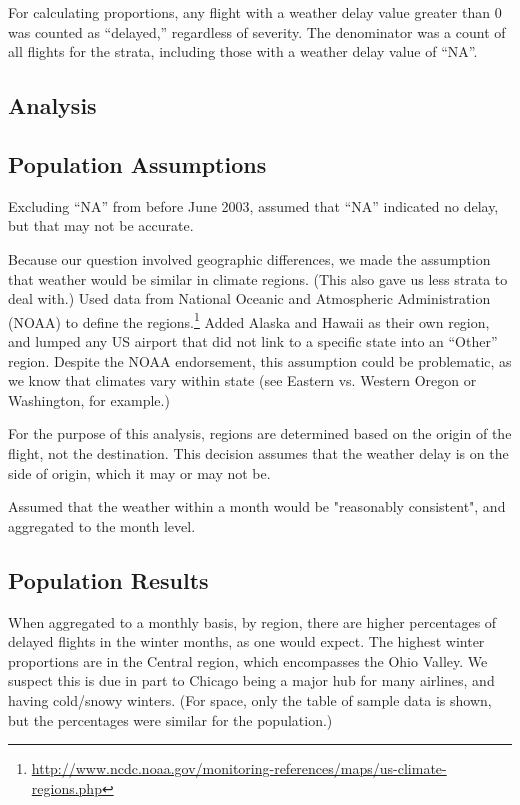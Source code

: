 \documentclass{article}
\begin{document}
For calculating proportions, any flight with a weather delay value greater than 0 was counted as ``delayed,'' regardless of severity. The denominator was a count of all flights for the strata, including those with a weather delay value of ``NA''. 
\begin{multicols}{2}
\section{Analysis}
\subsection{Population Assumptions}
Excluding ``NA'' from before June 2003, assumed that ``NA'' indicated no delay, but that may not be accurate.

Because our question involved geographic differences, we made the assumption that weather would be similar in climate regions. (This also gave us less strata to deal with.) Used data from National Oceanic and Atmospheric Administration (NOAA) to define the regions.\footnote{\url{http://www.ncdc.noaa.gov/monitoring-references/maps/us-climate-regions.php}} Added Alaska and Hawaii as their own region, and lumped any US airport that did not link to a specific state into an ``Other'' region. Despite the NOAA endorsement, this assumption could be problematic, as we know that climates vary within state (see Eastern vs. Western Oregon or Washington, for example.) 

For the purpose of this analysis, regions are determined based on the origin of the flight, not the destination. This decision assumes that the weather delay is on the side of origin, which it may or may not be. 

Assumed that the weather within a month would be "reasonably consistent", and aggregated to the month level.



\subsection{Population Results}
When aggregated to a monthly basis, by region, there are higher percentages of delayed flights in the winter months, as one would expect. The highest winter proportions are in the Central region, which encompasses the Ohio Valley. We suspect this is due in part to Chicago being a major hub for many airlines, and having cold/snowy winters. (For space, only the table of sample data is shown, but the percentages were similar for the population.)


\end{multicols}
\end{document}
